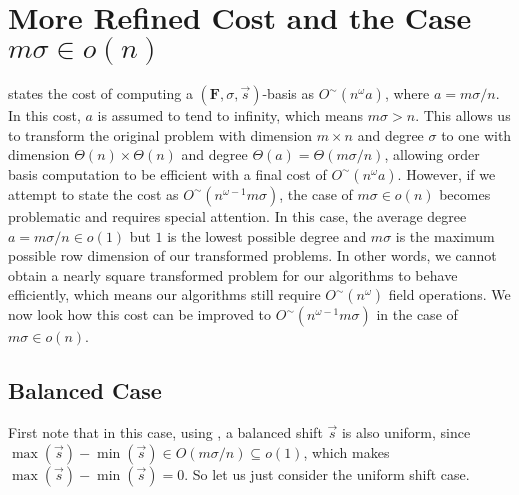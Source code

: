 
\section{More Refined Cost and the Case $m\sigma\in o(n)$}

\label{sec:removeCeilingFunction}

 states the cost of computing a $\left(\mathbf{F},\sigma,\vec{s}\right)$-basis
as $O^{\sim}\left(n^{\omega}a\right)$, where $a=m\sigma/n$. In this
cost, $a$ is assumed to tend to infinity, which means $m\sigma>n$.
This allows us to transform the original problem with dimension $m\times n$
and degree $\sigma$ to one with dimension $\Theta(n)\times\Theta(n)$
and degree $\Theta(a)=\Theta(m\sigma/n)$, allowing order basis computation
to be efficient with a final cost of $O^{\sim}(n^{\omega}a)$. However,
if we attempt to state the cost as $O^{\sim}\left(n^{\omega-1}m\sigma\right)$,
the case of $m\sigma\in o\left(n\right)$ becomes problematic and
requires special attention. In this case, the average degree $a=m\sigma/n\in o(1)$
but $1$ is the lowest possible degree and $m\sigma$ is the maximum
possible row dimension of our transformed problems. In other words,
we cannot obtain a nearly square transformed problem for our algorithms
to behave efficiently, which means our algorithms still require $O^{\sim}(n^{\omega})$
field operations. We now look how this cost can be improved to $O^{\sim}(n^{\omega-1}m\sigma)$
in the case of $m\sigma\in o\left(n\right)$.


\subsection{Balanced Case}

First note that in this case, using ,
a balanced shift $\vec{s}$ is also uniform, since $\max\left(\vec{s}\right)-\min\left(\vec{s}\right)\in O\left(m\sigma/n\right)\subseteq o(1)$,
which makes $\max\left(\vec{s}\right)-\min\left(\vec{s}\right)=0$.
So let us just consider the uniform shift case.

